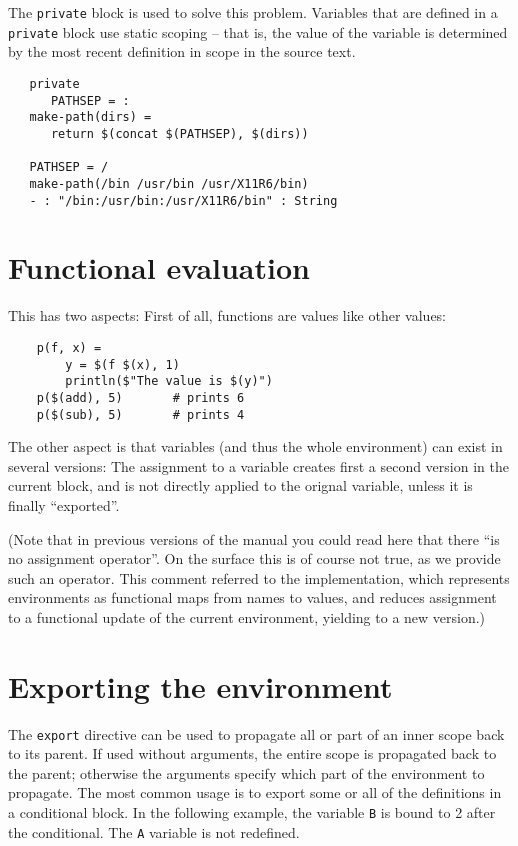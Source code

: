 The \verb+private+ block is used to solve this problem.  Variables
that are defined in a \verb+private+ block use static scoping -- that
is, the value of the variable is determined by the most recent
definition in scope in the source text.

\begin{verbatim}
   private
      PATHSEP = :
   make-path(dirs) =
      return $(concat $(PATHSEP), $(dirs))

   PATHSEP = /
   make-path(/bin /usr/bin /usr/X11R6/bin)
   - : "/bin:/usr/bin:/usr/X11R6/bin" : String
\end{verbatim}

\section{Functional evaluation}

This has two aspects: First of all, functions are values like other values:

\begin{verbatim}
    p(f, x) =
        y = $(f $(x), 1)
        println($"The value is $(y)")
    p($(add), 5)       # prints 6
    p($(sub), 5)       # prints 4
\end{verbatim}

The other aspect is that variables (and thus the whole environment) can exist
in several versions: The assignment to a variable creates first a second
version in the current block, and is not directly applied to the orignal
variable, unless it is finally ``exported''.

(Note that in previous versions of the manual you could read here that there
``is no assignment operator''. On the surface this is of course not true,
as we provide such an operator. This comment referred to the implementation,
which represents environments as functional maps from names to values,
and reduces assignment to a functional update of the current environment,
yielding to a new version.)

\section{Exporting the environment}
\label{section:export}
The \verb+export+ directive can be used to propagate all or part of an inner scope back to its
parent.  If used without
arguments, the entire scope is propagated back to the parent; otherwise the arguments specify which
part of the environment to propagate.  The most common usage is to export some or all of the definitions in a
conditional block.  In the following example, the variable \verb+B+ is bound to 2 after the
conditional.  The \verb+A+ variable is not redefined.

